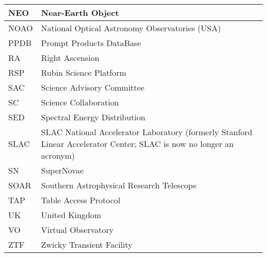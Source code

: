 \begin{longtable}{p{}p{}}
NEO & Near-Earth Object \\\hline
NOAO & National Optical Astronomy Observatories (USA) \\\hline
PPDB & Prompt Products DataBase \\\hline
RA & Right Ascension \\\hline
RSP & Rubin Science Platform \\\hline
SAC & Science Advisory Committee \\\hline
SC & Science Collaboration \\\hline
SED & Spectral Energy Distribution \\\hline
SLAC & SLAC National Accelerator Laboratory (formerly Stanford Linear Accelerator Center; SLAC is now no longer an acronym) \\\hline
SN & SuperNovae \\\hline
SOAR & Southern Astrophysical Research Telescope \\\hline
TAP & Table Access Protocol \\\hline
UK & United Kingdom \\\hline
VO & Virtual Observatory \\\hline
ZTF & Zwicky Transient Facility \\\hline
\end{longtable}
